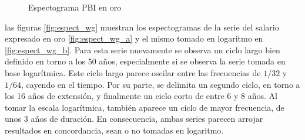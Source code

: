 \documentclass[a4paper]{article}
\begin{document}
\begin{figure}[H]
	\centering
	\caption{Espectograma PBI en oro} \label{fig:espect_PBI}
\end{figure}

las figuras \ref{fig:espect_wg} muestran los espectogramas de la serie del salario expresado en oro \ref{fig:espect_wg_a} y el mismo tomado en logaritmo en \ref{fig:espect_wg_b}. Para esta serie nuevamente se observa un ciclo largo bien definido en torno a los 50 años, especialmente si se observa la serie tomada en base logarítmica. Este ciclo largo parece oscilar entre las frecuencias de $1/32$ y $1/64$, cayendo en el tiempo. Por su parte, se delimita un segundo ciclo, en torno a los 16 años de extensión, y finalmente un ciclo corto de entre 6 y 8 años.  Al tomar la escala logarítmica, también aparece un ciclo de mayor frecuencia, de unos 3 años de duración. En consecuencia, ambas series parecen arrojar resultados en concordancia, sean o no tomadas en logaritmo. 
\end{document}
